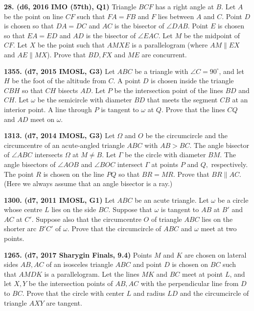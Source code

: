 \documentclass{article}
\begin{document}
\textbf{28. (\color{red}d6\color{black}, 2016 IMO (57th), Q1)} Triangle $BCF$ has a right angle at $B$. Let $A$ be the point on line $CF$ such that $FA=FB$ and $F$ lies between $A$ and $C$. Point $D$ is chosen so that $DA=DC$ and $AC$ is the bisector of $\angle{DAB}$. Point $E$ is chosen so that $EA=ED$ and $AD$ is the bisector of $\angle{EAC}$. Let $M$ be the midpoint of $CF$. Let $X$ be the point such that $AMXE$ is a parallelogram (where $AM \parallel EX$ and $AE \parallel MX$). Prove that $BD,FX$ and $ME$ are concurrent.

\textbf{1355. (\color{red}d7\color{black}, 2015 IMOSL, G3)} Let $ABC$ be a triangle with $\angle{C} = 90^{\circ}$, and let $H$ be the foot of the altitude from $C$. A point $D$ is chosen inside the triangle $CBH$ so that $CH$ bisects $AD$. Let $P$ be the intersection point of the lines $BD$ and $CH$. Let $\omega$ be the semicircle with diameter $BD$ that meets the segment $CB$ at an interior point. A line through $P$ is tangent to $\omega$ at $Q$. Prove that the lines $CQ$ and $AD$ meet on $\omega$.

\textbf{1313. (\color{red}d7\color{black}, 2014 IMOSL, G3)} Let $\Omega$ and $O$ be the circumcircle and the circumcentre of an acute-angled triangle $ABC$ with $AB > BC$. The angle bisector of $\angle ABC$ intersects $\Omega$ at $M \ne B$. Let $\Gamma$ be the circle with diameter $BM$. The angle bisectors of $\angle AOB$ and $\angle BOC$ intersect $\Gamma$ at points $P$ and $Q,$ respectively. The point $R$ is chosen on the line $P Q$ so that $BR = MR$. Prove that $BR\parallel AC$.
(Here we always assume that an angle bisector is a ray.)

\textbf{1300. (\color{red}d7\color{black}, 2011 IMOSL, G1)} Let $ABC$ be an acute triangle. Let $\omega$ be a circle whose centre $L$ lies on the side $BC$. Suppose that $\omega$ is tangent to $AB$ at $B'$ and $AC$ at $C'$. Suppose also that the circumcentre $O$ of triangle $ABC$ lies on the shorter arc $B'C'$ of $\omega$. Prove that the circumcircle of $ABC$ and $\omega$ meet at two points.

\textbf{1265. (\color{red}d7\color{black}, 2017 Sharygin Finals, 9.4)} Points $M$ and $K$ are chosen on lateral sides $AB,AC$ of an isosceles triangle $ABC$ and point $D$ is chosen on $BC$ such that $AMDK$ is a parallelogram. Let the lines $MK$ and $BC$ meet at point $L$, and let $X,Y$ be the intersection points of $AB,AC$ with the perpendicular line from $D$ to $BC$. Prove that the circle with center $L$ and radius $LD$ and the circumcircle of triangle $AXY$ are tangent.
\end{document}
